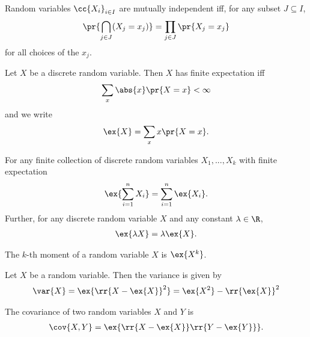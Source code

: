 \documentclass{article}
\begin{document}
\begin{definition}
  Random variables $\cc{X_i}_{i\in I}$ are mutually independent iff, for any subset
  $J\subseteq I$,
  \begin{align*}
    \pr{\bigcap_{j\in J}(X_j = x_j)} = \prod_{j\in J} \pr{X_j = x_j}
  \end{align*}
  for all choices of the $x_j$.
\end{definition}

\begin{definition}
  \label{def:expectation}
  Let $X$ be a discrete random variable. Then $X$ has finite expectation iff
  \begin{align*}
    \sum_{x} \abs{x} \pr{X=x} < \infty
  \end{align*}
  and we write
  \begin{align*}
    \ex{X} = \sum_{x} x \pr{X=x}.
  \end{align*}
\end{definition}

\begin{theorem}
  For any finite collection of discrete random variables $X_1,...,X_k$
  with finite expectation
  \begin{align*}
    \ex{\sum_{i=1}^{n} X_i}=\sum_{i=1}^{n} \ex{X_i}.
  \end{align*}
  Further, for any discrete random variable $X$ and any constant $\lambda\in\R$,
  \begin{align*}
    \ex{\lambda X}=\lambda\ex{X}.
  \end{align*}
\end{theorem}

\begin{definition}
  \label{def:moment}
  The $k$-th moment of a random variable $X$ is $\ex{X^k}$.
\end{definition}

\begin{definition}
  \label{def:variance}
  Let $X$ be a random variable. Then the variance is given by
  \begin{align*}
    \var{X}=\ex{\rr{X-\ex{X}}^2} = \ex{X^2}-\rr{\ex{X}}^2
  \end{align*}
\end{definition}

\begin{definition}
  \label{def:covariance}
  The covariance of two random variables $X$ and $Y$ is
  \begin{align*}
    \cov{X,Y}=\ex{\rr{X-\ex{X}}\rr{Y-\ex{Y}}}.
  \end{align*}
\end{definition}
\end{document}
